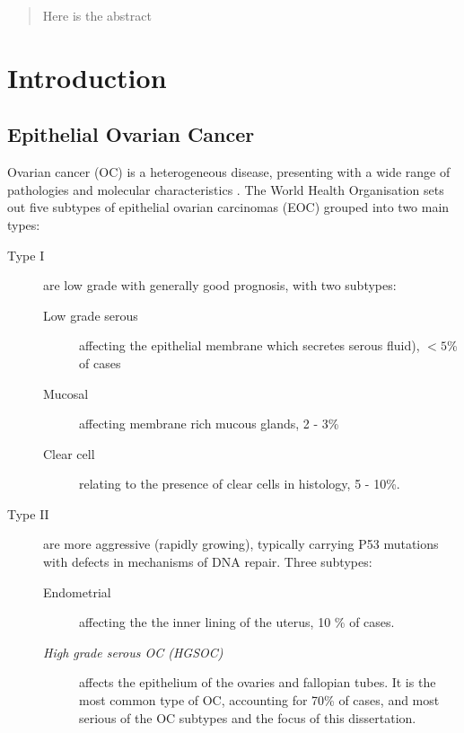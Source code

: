 \documentclass[draft,tikz, 12pt,a4paper,oneside,fleqn]{article}
\begin{document}
\newpage
\setcounter{page}{1}

\setlength{\parskip}{0em}
\tableofcontents
\setlength{\parskip}{1em}
\newpage


\begin{abstract}
Here is the abstract
\end{abstract}
\newpage


\section{Introduction}

\subsection{Epithelial Ovarian Cancer}
\label{sec-epithelial-ovarian-cancer}


Ovarian cancer (OC) is a heterogeneous disease, presenting with a wide range of pathologies and molecular characteristics .  The World Health Organisation sets out five subtypes of epithelial ovarian carcinomas (EOC) grouped into two main types\cite{Kossai2018, Lisio2019}: 

\begin{description}
\item[Type I] are low grade with generally good prognosis, with two subtypes:
\begin{description}
\item[Low grade serous] affecting the epithelial membrane which secretes serous fluid), $< 5$\% of cases
\item[Mucosal] affecting membrane rich mucous glands, 2 - 3\% 
\item[Clear cell] relating to the presence of clear cells in histology, 5 - 10\%.
\end{description}
\item[Type II] are more aggressive (rapidly growing), typically carrying P53 mutations with defects in mechanisms of DNA repair. Three subtypes:
\begin{description}
\item[Endometrial] affecting the the inner lining of the uterus, 10 \% of cases.
\item[\emph{High grade serous OC (HGSOC)}] affects the epithelium of the ovaries and fallopian tubes.  It is the most common type of OC, accounting for 70\% of cases, and most serious of the OC subtypes and the focus of this dissertation.
\end{description}
\end{description}
\end{document}
